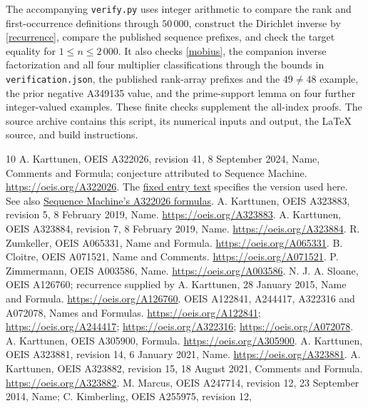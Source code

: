 \documentclass[11pt]{article}
\begin{document}
The accompanying \texttt{verify.py} uses integer arithmetic to compare
the rank and first-occurrence definitions through $50\,000$, construct
the Dirichlet inverse by \eqref{recurrence}, compare the published
sequence prefixes, and check the target equality for $1\leq n\leq2\,000$.
It also checks \eqref{mobius}, the companion inverse factorization and
all four multiplier classifications through the bounds in
\texttt{verification.json}, the published rank-array prefixes and the
$49\ne48$ example, the prior negative A349135 value, and the prime-support lemma on four further
integer-valued examples. These finite checks supplement the all-index
proofs. The source archive contains this script,
its numerical inputs and output, the LaTeX source, and build instructions.

\begin{thebibliography}{10}
 A. Karttunen, OEIS A322026, revision 41,
8 September 2024, Name, Comments and Formula; conjecture attributed to
Sequence Machine. \url{https://oeis.org/A322026}.
The \href{https://github.com/oeis/oeisdata/blob/f151d82acb28766e6034a902ed9fd0632b16f986/seq/A322/A322026.seq}{fixed entry text}
specifies the version used here. See also
\href{https://sequencedb.net/s/A322026}{Sequence Machine's A322026 formulas}.
 A. Karttunen, OEIS A323883, revision 5,
8 February 2019, Name. \url{https://oeis.org/A323883}.
 A. Karttunen, OEIS A323884, revision 7,
8 February 2019, Name. \url{https://oeis.org/A323884}.
 R. Zumkeller, OEIS A065331, Name and Formula.
\url{https://oeis.org/A065331}.
 B. Cloitre, OEIS A071521, Name and Comments.
\url{https://oeis.org/A071521}.
 P. Zimmermann, OEIS A003586, Name.
\url{https://oeis.org/A003586}.
 N. J. A. Sloane, OEIS A126760;
recurrence supplied by A. Karttunen, 28 January 2015, Name and Formula.
\url{https://oeis.org/A126760}.
 OEIS A122841, A244417, A322316 and A072078,
Names and Formulas. \url{https://oeis.org/A122841};
\url{https://oeis.org/A244417}; \url{https://oeis.org/A322316};
\url{https://oeis.org/A072078}.
 A. Karttunen, OEIS A305900, Formula.
\url{https://oeis.org/A305900}.
 A. Karttunen, OEIS A323881, revision 14,
6 January 2021, Name. \url{https://oeis.org/A323881}.
 A. Karttunen, OEIS A323882, revision 15,
18 August 2021, Comments and Formula. \url{https://oeis.org/A323882}.
 M. Marcus, OEIS A247714, revision 12,
23 September 2014, Name; C. Kimberling, OEIS A255975, revision 12,

\end{thebibliography}
\end{document}
